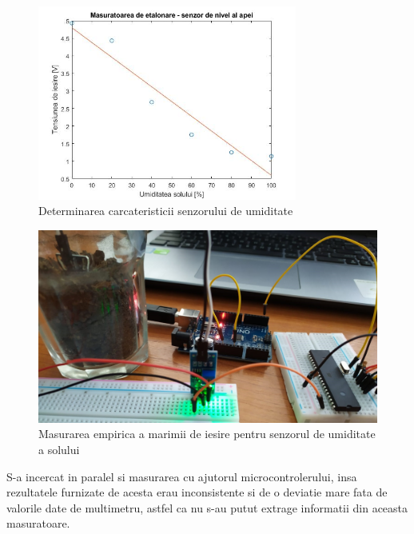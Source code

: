 \documentclass[12pt]{article}
\begin{document}
\begin{figure}[H]
\centering
\includegraphics[width=0.76\textwidth]{Pictures/umidmas.jpg}
\caption{Determinarea carcateristicii senzorului de umiditate}
\end{figure}

\newpage

\begin{figure}[H]
\centering
\includegraphics[width=\textwidth]{Pictures/umidemp.jpeg}
\caption{Masurarea empirica a marimii de iesire pentru senzorul de umiditate a solului}
\end{figure}

S-a incercat in paralel si masurarea cu ajutorul microcontrolerului, insa rezultatele furnizate de acesta erau inconsistente si de o deviatie mare fata de valorile date de multimetru, astfel ca nu s-au putut extrage informatii din aceasta masuratoare.
\end{document}
